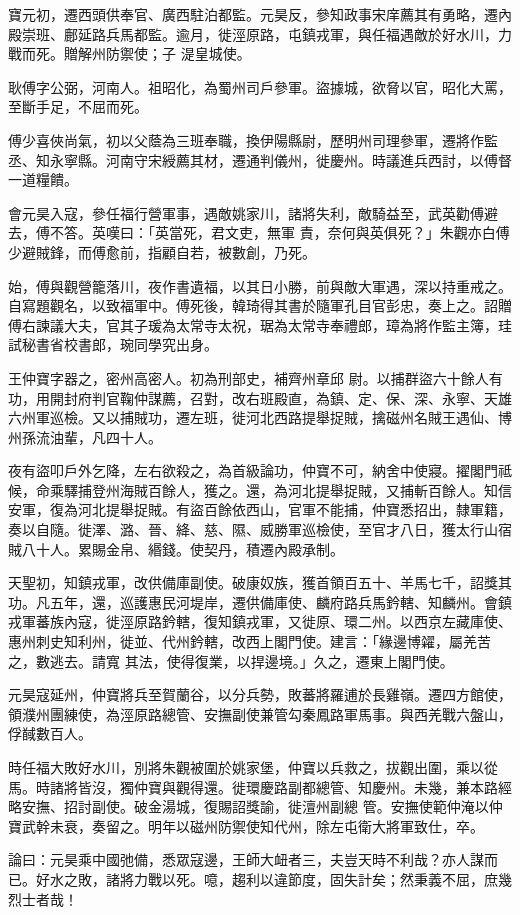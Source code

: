 \begin{pinyinscope}
 寶元初，遷西頭供奉官、廣西駐泊都監。元昊反，參知政事宋庠薦其有勇略，遷內殿崇班、鄜延路兵馬都監。逾月，徙涇原路，屯鎮戎軍，與任福遇敵於好水川，力戰而死。贈解州防禦使；子
 湜皇城使。



 耿傅字公弼，河南人。祖昭化，為蜀州司戶參軍。盜據城，欲脅以官，昭化大罵，至斷手足，不屈而死。



 傅少喜俠尚氣，初以父蔭為三班奉職，換伊陽縣尉，歷明州司理參軍，遷將作監丞、知永寧縣。河南守宋綬薦其材，遷通判儀州，徙慶州。時議進兵西討，以傅督一道糧饋。



 會元昊入寇，參任福行營軍事，遇敵姚家川，諸將失利，敵騎益至，武英勸傅避去，傅不答。英嘆曰：「英當死，君文吏，無軍
 責，奈何與英俱死？」朱觀亦白傅少避賊鋒，而傅愈前，指顧自若，被數創，乃死。



 始，傅與觀營籠落川，夜作書遺福，以其日小勝，前與敵大軍遇，深以持重戒之。自寫題觀名，以致福軍中。傅死後，韓琦得其書於隨軍孔目官彭忠，奏上之。詔贈傅右諫議大夫，官其子瑗為太常寺太祝，琚為太常寺奉禮郎，璋為將作監主簿，珪試秘書省校書郎，琬同學究出身。



 王仲寶字器之，密州高密人。初為刑部史，補齊州章邱
 尉。以捕群盜六十餘人有功，用開封府判官鞠仲謀薦，召對，改右班殿直，為鎮、定、保、深、永寧、天雄六州軍巡檢。又以捕賊功，遷左班，徙河北西路提舉捉賊，擒磁州名賊王遇仙、博州孫流油輩，凡四十人。



 夜有盜叩戶外乞降，左右欲殺之，為首級論功，仲寶不可，納舍中使寢。擢閣門祗候，命乘驛捕登州海賊百餘人，獲之。還，為河北提舉捉賊，又捕斬百餘人。知信安軍，復為河北提舉捉賊。有盜百餘依西山，官軍不能捕，仲寶悉招出，隸軍籍，
 奏以自隨。徙澤、潞、晉、絳、慈、隰、威勝軍巡檢使，至官才八日，獲太行山宿賊八十人。累賜金帛、緡錢。使契丹，積遷內殿承制。



 天聖初，知鎮戎軍，改供備庫副使。破康奴族，獲首領百五十、羊馬七千，詔獎其功。凡五年，還，巡護惠民河堤岸，遷供備庫使、麟府路兵馬鈐轄、知麟州。會鎮戎軍蕃族內寇，徙涇原路鈐轄，復知鎮戎軍，又徙原、環二州。以西京左藏庫使、惠州刺史知利州，徙並、代州鈐轄，改西上閣門使。建言：「緣邊博糴，屬羌苦之，數逃去。請寬
 其法，使得復業，以捍邊境。」久之，遷東上閣門使。



 元昊寇延州，仲寶將兵至賀蘭谷，以分兵勢，敗蕃將羅逋於長雞嶺。遷四方館使，領濮州團練使，為涇原路總管、安撫副使兼管勾秦鳳路軍馬事。與西羌戰六盤山，俘馘數百人。



 時任福大敗好水川，別將朱觀被圍於姚家堡，仲寶以兵救之，拔觀出圍，乘以從馬。時諸將皆沒，獨仲寶與觀得還。徙環慶路副都總管、知慶州。未幾，兼本路經略安撫、招討副使。破金湯城，復賜詔獎諭，徙澶州副總
 管。安撫使範仲淹以仲寶武幹未衰，奏留之。明年以磁州防禦使知代州，除左屯衛大將軍致仕，卒。



 論曰：元昊乘中國弛備，悉眾寇邊，王師大衄者三，夫豈天時不利哉？亦人謀而已。好水之敗，諸將力戰以死。噫，趨利以違節度，固失計矣；然秉義不屈，庶幾烈士者哉！



\end{pinyinscope}